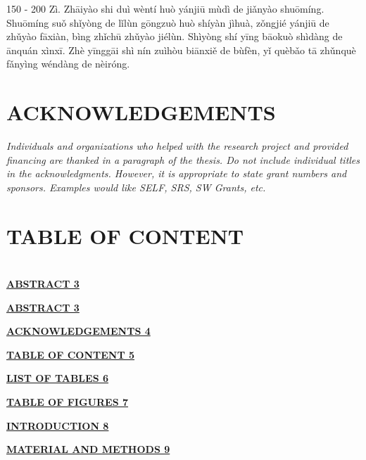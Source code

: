 \documentclass[
]{article}
\begin{document}
    150 - 200 Zì. Zhāiyào shi duì wèntí huò yánjiū mùdì de jiǎnyào shuōmíng.
    Shuōmíng suǒ shǐyòng de lǐlùn gōngzuò huò shíyàn jìhuà, zǒngjié yánjiū
    de zhǔyào fāxiàn, bìng zhǐchū zhǔyào jiélùn. Shìyòng shí yīng bāokuò
    shìdàng de ānquán xìnxī. Zhè yīnggāi shì nín zuìhòu biānxiě de bùfèn, yǐ
    quèbǎo tā zhǔnquè fǎnyìng wéndàng de nèiróng.

    \hypertarget{acknowledgements}{%


        \section{ACKNOWLEDGEMENTS}\label{acknowledgements}}

    \emph{Individuals and organizations who helped with the research project
    and provided financing are thanked in a paragraph of the thesis. Do not
    include individual titles in the acknowledgments. However, it is
    appropriate to state grant numbers and sponsors. Examples would like
    SELF, SRS, SW Grants, etc.}

    \hypertarget{table-of-content}{%


        \section{TABLE OF CONTENT}\label{table-of-content}}

    \hypertarget{section}{%


        \section{}\label{section}}

    \protect\hyperlink{_Toc93021168}{\textbf{ABSTRACT 3}}

    \protect\hyperlink{_Toc93021169}{\textbf{ABSTRACT 3}}

    \protect\hyperlink{acknowledgements}{\textbf{ACKNOWLEDGEMENTS 4}}

    \protect\hyperlink{table-of-content}{\textbf{TABLE OF CONTENT 5}}

    \protect\hyperlink{list-of-tables}{\textbf{LIST OF TABLES 6}}

    \protect\hyperlink{table-of-figures}{\textbf{TABLE OF FIGURES 7}}

    \protect\hyperlink{section-1}{\textbf{INTRODUCTION 8}}

    \protect\hyperlink{material-and-methods}{\textbf{MATERIAL AND METHODS
    9}}
\end{document}

